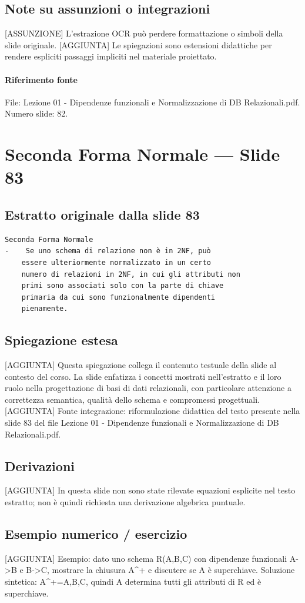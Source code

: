 \documentclass[11pt]{article}
\begin{document}
\subsection*{Note su assunzioni o integrazioni}
[ASSUNZIONE] L'estrazione OCR può perdere formattazione o simboli della slide originale.
[AGGIUNTA] Le spiegazioni sono estensioni didattiche per rendere espliciti passaggi impliciti nel materiale proiettato.
\paragraph{Riferimento fonte} File: Lezione 01 - Dipendenze funzionali e Normalizzazione di DB Relazionali.pdf. Numero slide: 82.
\section{Seconda Forma Normale --- Slide 83}
\subsection*{Estratto originale dalla slide 83}
\begin{lstlisting}
Seconda Forma Normale
-    Se uno schema di relazione non è in 2NF, può
    essere ulteriormente normalizzato in un certo
    numero di relazioni in 2NF, in cui gli attributi non
    primi sono associati solo con la parte di chiave
    primaria da cui sono funzionalmente dipendenti
    pienamente.
\end{lstlisting}
\subsection*{Spiegazione estesa}
[AGGIUNTA] Questa spiegazione collega il contenuto testuale della slide al contesto del corso. La slide enfatizza i concetti mostrati nell'estratto e il loro ruolo nella progettazione di basi di dati relazionali, con particolare attenzione a correttezza semantica, qualità dello schema e compromessi progettuali.
[AGGIUNTA] Fonte integrazione: riformulazione didattica del testo presente nella slide 83 del file Lezione 01 - Dipendenze funzionali e Normalizzazione di DB Relazionali.pdf.
\subsection*{Derivazioni}
[AGGIUNTA] In questa slide non sono state rilevate equazioni esplicite nel testo estratto; non è quindi richiesta una derivazione algebrica puntuale.
\subsection*{Esempio numerico / esercizio}
[AGGIUNTA] Esempio: dato uno schema R(A,B,C) con dipendenze funzionali A->B e B->C, mostrare la chiusura A^+ e discutere se A è superchiave. Soluzione sintetica: A^+={A,B,C}, quindi A determina tutti gli attributi di R ed è superchiave.
\end{document}
